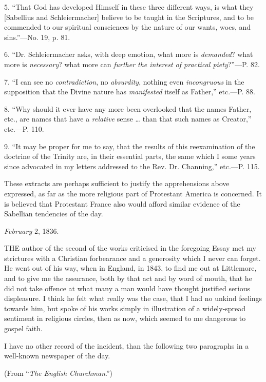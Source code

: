 5. ``That God has
developed Himself in these three different ways, is what they [Sabellius
and Schleiermacher] believe to be taught in the Scriptures, and to be
commended to our spiritual consciences by the nature of our wants,
woes, and sins.''—No. 19, p. 81.

6. ``Dr.
Schleiermacher asks, with deep emotion, what more is \emph{demanded}?
what more is \emph{necessary}? what more can \emph{further the interest
of practical piety}?''—P. 82.

7. ``I can see no
\emph{contradiction}, no \emph{absurdity}, nothing even \emph{incongruous}
in the supposition that the Divine nature has \emph{manifested} itself
as Father,'' etc.—P. 88.

8. ``Why should
it ever have any more been overlooked that the names Father, etc., are
names that have a \emph{relative} sense … than that such names as
Creator,'' etc.—P. 110.

9. ``It may be
proper for me to say, that the results of this reexamination of the
doctrine of the Trinity are, in their essential parts, the same which
I some years since advocated in my letters addressed to the Rev. Dr.
Channing,'' etc.—P. 115.

These extracts are perhaps sufficient to justify
the apprehensions above expressed, as far as the more religious part
of Protestant America is concerned. It is believed that Protestant
France also would afford similar evidence of the Sabellian tendencies
of the day.

\emph{February} 2, 1836.


THE author
of the second of the works criticised in the foregoing Essay met my
strictures with a Christian forbearance and a generosity which I never
can forget. He went out of his way, when in England, in 1843, to find
me out at Littlemore, and to give me the assurance, both by that act
and by word of mouth, that he did not take offence at what many a man
would have thought justified serious displeasure. I think he felt what
really was the case, that I had no unkind feelings towards him, but
spoke of his works simply in illustration of a widely-spread sentiment
in religious circles, then as now, which seemed to me dangerous to
gospel faith.

I have no other record of the incident, than the
following two paragraphs in a well-known newspaper of the day.

(From
``\emph{The English Churchman}.'')

